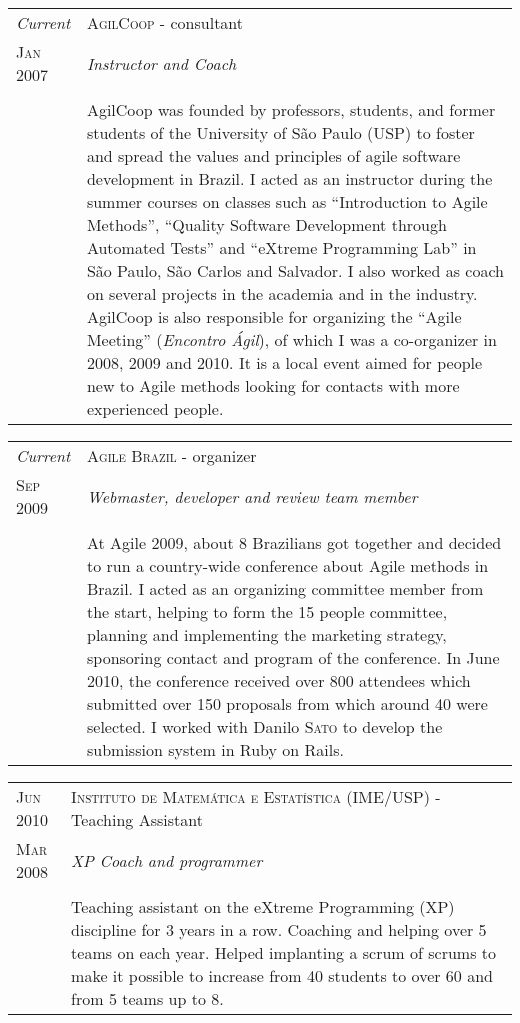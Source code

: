 \documentclass[letter,10pt]{article}
\begin{document}
\begin{tabular}{p{2.5cm}|p{13.5cm}}
  \emph{Current} & \textsc{AgilCoop} - consultant\\
  \textsc{Jan 2007}& \emph{Instructor and Coach}\\
  &\\
  &AgilCoop was founded by professors,
  students, and former students of the University of São Paulo (USP)
  to foster and spread the values and principles of agile software
  development in Brazil. I acted as an instructor during the summer
  courses on classes such as ``Introduction to Agile Methods'',
  ``Quality Software Development through Automated Tests'' and
  ``eXtreme Programming Lab'' in São Paulo, São Carlos and Salvador.
  I also worked as coach on several projects in the academia
  and in the industry. AgilCoop is also responsible for organizing
  the ``Agile Meeting'' (\emph{Encontro Ágil}), of which I was a
  co-organizer in 2008, 2009 and 2010. It is a local
  event aimed for people new to Agile methods looking for contacts
  with more experienced people.
\end{tabular}

\begin{tabular}{p{2.5cm}|p{13.5cm}}
  \emph{Current} & \textsc{Agile Brazil} - organizer\\
  \textsc{Sep 2009}& \emph{Webmaster, developer and review team
    member}\\
  &\\
  &At Agile 2009, about 8 Brazilians got together and
  decided to run a country-wide conference about Agile methods in
  Brazil. I acted as an organizing committee member from the start, helping to form the
  15 people committee, planning and implementing the marketing
  strategy, sponsoring contact and program of the conference. In
  June 2010, the conference received over 800 attendees which
  submitted over 150 proposals from which around 40 were selected. I
  worked with Danilo \textsc{Sato} to develop the submission system in Ruby on
  Rails.
\end{tabular}

\begin{tabular}{p{2.5cm}|p{13.5cm}}
  \textsc{Jun 2010} & \textsc{Instituto de Matemática e Estatística
    (IME/USP)} - Teaching Assistant\\
  \textsc{Mar 2008}& \emph{XP Coach and programmer}\\
  &\\
  & Teaching assistant on the eXtreme Programming (XP) discipline for
  3 years in a row. Coaching and helping over 5 teams on each
  year. Helped implanting a scrum of scrums to make it possible to
  increase from 40 students to over 60 and from 5 teams up to 8.
\end{tabular}
\end{document}

